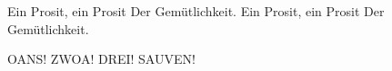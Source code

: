 \begin{verse*}
Ein Prosit, ein Prosit
Der Gemütlichkeit.
Ein Prosit, ein Prosit
Der Gemütlichkeit.
\end{verse*}

\begin{verse*}
OANS! ZWOA! DREI! SAUVEN!
\end{verse*}